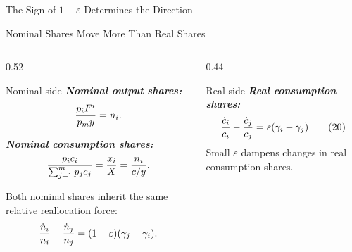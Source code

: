 \begin{frame}{The Sign of $1-\varepsilon$ Determines the Direction}
  \vspace{0.18cm}
  \begin{center}
  \end{center}
\end{frame}

\begin{frame}[label=nominalshares]{Nominal Shares Move More Than Real Shares}
  \footnotesize
  \begin{columns}[T,onlytextwidth]
    \begin{column}{0.52\textwidth}
      \begin{block}{Nominal side}
        \scriptsize
        \textbf{\textit{Nominal output shares:}}
        \[
          {\color{black}
          \frac{p_iF^i}{p_my}=n_i.}
        \]

        \textbf{\textit{Nominal consumption shares:}}
        \[
          {\color{black}
          \frac{p_ic_i}{\sum_{j=1}^m p_jc_j}
          =\frac{x_i}{X}
          =\frac{n_i}{c/y}.}
        \]

        Both nominal shares inherit the same relative reallocation force:
        \[
          {\color{black}
          \frac{\dot n_i}{n_i}
          -
          \frac{\dot n_j}{n_j}
          =
          (1-\varepsilon)(\gamma_j-\gamma_i).}
        \]
      \end{block}
    \end{column}
    \begin{column}{0.44\textwidth}
      \begin{alertblock}{Real side}
        \scriptsize
        \textbf{\textit{Real consumption shares:}}
        \begin{equation*}
          {\color{black}
          \frac{\dot c_i}{c_i}-\frac{\dot c_j}{c_j}
          =\varepsilon(\gamma_i-\gamma_j)
          \qquad (20)}
        \end{equation*}
        Small $\varepsilon$ dampens changes in real consumption shares.
      \end{alertblock}
    \end{column}
  \end{columns}
\end{frame}

